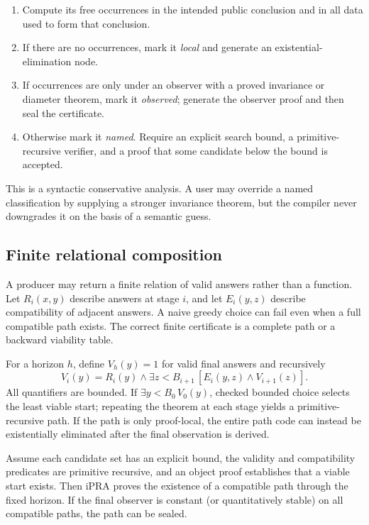 \begin{enumerate}
\item Compute its free occurrences in the intended public conclusion and in all data used to form
      that conclusion.
\item If there are no occurrences, mark it \emph{local} and generate an existential-elimination
      node.
\item If occurrences are only under an observer with a proved invariance or diameter theorem, mark
      it \emph{observed}; generate the observer proof and then seal the certificate.
\item Otherwise mark it \emph{named}.  Require an explicit search bound, a primitive-recursive
      verifier, and a proof that some candidate below the bound is accepted.
\end{enumerate}

This is a syntactic conservative analysis.  A user may override a named classification by supplying a
stronger invariance theorem, but the compiler never downgrades it on the basis of a semantic guess.

\subsection{Finite relational composition}

A producer may return a finite relation of valid answers rather than a function.  Let
\(R_i(x,y)\) describe answers at stage \(i\), and let \(E_i(y,z)\) describe compatibility of adjacent
answers.  A naive greedy choice can fail even when a full compatible path exists.  The correct finite
certificate is a complete path or a backward viability table.

For a horizon \(h\), define \(V_h(y)=1\) for valid final answers and recursively
\[
 V_i(y)=R_i(y)\land \exists z<B_{i+1}\,[E_i(y,z)\land V_{i+1}(z)].
\]
All quantifiers are bounded.  If \(\exists y<B_0\,V_0(y)\), checked bounded choice selects the least
viable start; repeating the theorem at each stage yields a primitive-recursive path.  If the path is
only proof-local, the entire path code can instead be existentially eliminated after the final
observation is derived.

\begin{proposition}\label{prop:relational}
Assume each candidate set has an explicit bound, the validity and compatibility predicates are
primitive recursive, and an object proof establishes that a viable start exists.  Then iPRA proves
the existence of a compatible path through the fixed horizon.  If the final observer is constant (or
quantitatively stable) on all compatible paths, the path can be sealed.
\end{proposition}


